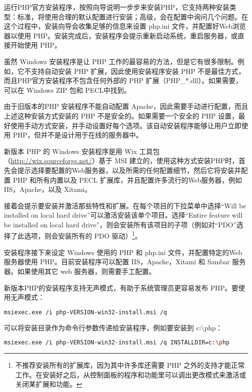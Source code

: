 运行PHP官方安装程序，按照向导说明一步步来安装PHP，它支持两种安装类型：标准，将使用合理的默认配置进行安装；高级，会在配置中询问几个问题。在这个过程中，安装向导会收集足够的信息来设置 php.ini 文件，并配置好Web浏览器以使用 PHP。安装完成后，安装程序会提示重新启动系统，重启服务器，或直接开始使用 PHP。

虽然 Windows 安装程序是让 PHP 工作的最容易的方法，但是它有很多限制。例如，它不支持自动安装 PHP 扩展，因此使用安装程序安装 PHP 不是最佳方式，而且PHP官方安装程序不包含任何外部的 PHP 扩展（PHP\_*.dll）。如果需要，可以在 Windows ZIP 包和 PECL中找到。

由于旧版本的PHP 安装程序不能自动配置 Apache，因此需要手动进行配置，而且上述这种安装方式安装的 PHP 不是安全的。如果需要一个安全的 PHP 设置，最好使用手动方式安装，并手动设置好每个选项。该自动安装程序能够让用户立即使用 PHP，但并不是设计用于在线的服务器中。

新版本 PHP 的 Windows 安装程序是用 Wix 工具包（\url{http://wix.sourceforge.net/}）基于 MSI 建立的，使用这种方式安装PHP时，首先会提示选择要配置的Web服务器，以及所需的任何配置细节，然后它将安装并配置 PHP 和所有内置以及 PECL 扩展库，并且配置许多流行的Web服务器，例如 IIS，Apache，以及 Xitami。

接着会提示要安装并激活那些特性和扩展。在每个项目的下拉菜单中选择“Will be installed on local hard drive”可以激活安装该单个项目。选择“Entire feature will be installed on local hard drive”，则会安装所有该项目的子项（例如对“PDO”选择了此选项，则会安装所有的 PDO 驱动）\footnote{不推荐安装所有的扩展库，因为其中许多库还需要 PHP 之外的支持才能正常工作。在安装好之后，从控制面板的程序和功能里可以调出更改模式来激活或关闭某扩展和功能。}。

安装程序接下来设定 Windows 使用的 PHP 和 php.ini 文件，并配置特定的Web服务器使用 PHP。目前安装程序可以配置 IIS，Apache，Xitami 和 Sambar 服务器。如果使用其它 web 服务器，则需要手工配置。


新版本PHP的安装程序支持无声模式，有助于系统管理员更容易发布 PHP。要使用无声模式：

\begin{lstlisting}[language=bash]
msiexec.exe /i php-VERSION-win32-install.msi /q
\end{lstlisting}

可以将安装目录作为命令行参数传递给安装程序，例如要安装到 c:{\textbackslash}php：

\begin{lstlisting}[language=bash]
msiexec.exe /i php-VERSION-win32-install.msi /q INSTALLDIR=c:\php
\end{lstlisting}



